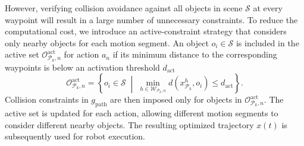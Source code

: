 \documentclass[letterpaper, 10 pt, conference]{ieeeconf}  %
\begin{document}
However, verifying collision avoidance against all objects in scene $\mathcal{S}$ at every waypoint will result in a large number of unnecessary constraints. 
To reduce the computational cost, we introduce an active-constraint strategy that considers only nearby objects for each motion segment. 
An object $o_i\in\mathcal{S}$ is included in the active set $\mathcal{O}_{\mathcal{P}_k,n}^{\mathrm{act}}$ for action $a_n$ if its minimum distance to the corresponding waypoints is below an activation threshold $d_{\mathrm{act}}$
\begin{equation}
\mathcal{O}_{\mathcal{P}_k,n}^{\mathrm{act}} = \left\{ o_i\in\mathcal{S} \;\middle|\; \min_{h\in\mathcal{W}_{\mathcal{P}_k,n}} d(x_{\mathcal{P}_k}^{h},o_i) \le d_{\mathrm{act}} \right\}.
\end{equation}
Collision constraints in $g_{\mathrm{path}}$ are then imposed only for objects in $\mathcal{O}_{\mathcal{P}_k,n}^{\mathrm{act}}$. 
The active set is updated for each action, allowing different motion segments to consider different nearby objects.
The resulting optimized trajectory $x(t)$ is subsequently used for robot execution.

\end{document}
